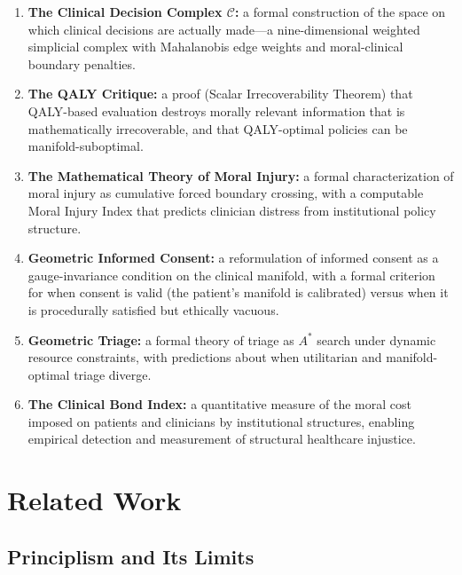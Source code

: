 \documentclass[12pt]{article}
\theoremstyle{definition}
\theoremstyle{remark}
\newcommand{\C}{\mathcal{C}}               %
\begin{document}
\begin{enumerate}
    \item \textbf{The Clinical Decision Complex $\C$:} a formal construction of the space on which clinical decisions are actually made---a nine-dimensional weighted simplicial complex with Mahalanobis edge weights and moral-clinical boundary penalties.

    \item \textbf{The QALY Critique:} a proof (Scalar Irrecoverability Theorem) that QALY-based evaluation destroys morally relevant information that is mathematically irrecoverable, and that QALY-optimal policies can be manifold-suboptimal.

    \item \textbf{The Mathematical Theory of Moral Injury:} a formal characterization of moral injury as cumulative forced boundary crossing, with a computable Moral Injury Index that predicts clinician distress from institutional policy structure.

    \item \textbf{Geometric Informed Consent:} a reformulation of informed consent as a gauge-invariance condition on the clinical manifold, with a formal criterion for when consent is valid (the patient's manifold is calibrated) versus when it is procedurally satisfied but ethically vacuous.

    \item \textbf{Geometric Triage:} a formal theory of triage as $A^*$ search under dynamic resource constraints, with predictions about when utilitarian and manifold-optimal triage diverge.

    \item \textbf{The Clinical Bond Index:} a quantitative measure of the moral cost imposed on patients and clinicians by institutional structures, enabling empirical detection and measurement of structural healthcare injustice.
\end{enumerate}


\section{Related Work}
\label{sec:related}

\subsection{Principlism and Its Limits}
\end{document}
